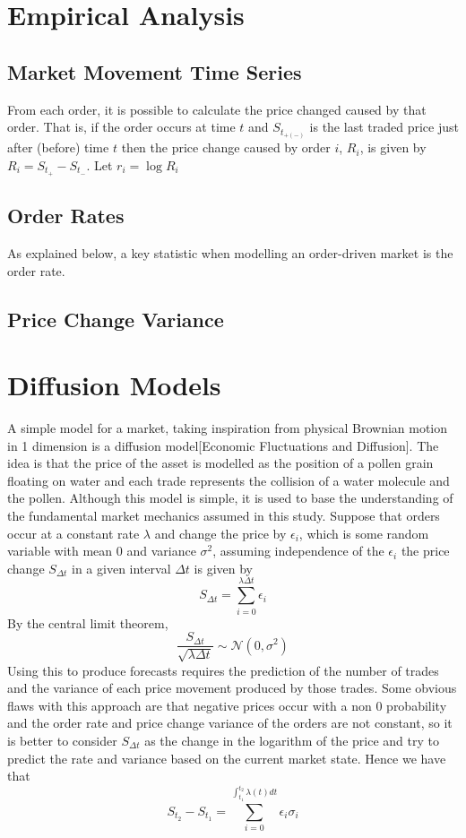 \documentclass[a4paper,10pt]{article}
\begin{document}
\section{Empirical Analysis}
\subsection{Market Movement Time Series}
From each order, it is possible to calculate the price changed caused by that order. That is, if the order occurs at time $t$ and $S_{t_{+(-)}}$ is the last traded price just after (before) time $t$ then the price change caused by order $i$, $R_i$, is given by $R_i = S_{t_{+}} - S_{t_{-}}$. Let $r_i = \log R_i$
\subsection{Order Rates}
As explained below, a key statistic when modelling an order-driven market is the order rate.
\subsection{Price Change Variance}
\section{Diffusion Models}
A simple model for a market, taking inspiration from physical Brownian motion in 1 dimension is a diffusion model[Economic Fluctuations and Diffusion]. The idea is that the price of the asset is modelled as the position of a pollen grain floating on water and each trade represents the collision of a water molecule and the pollen. Although this model is simple, it is used to base the understanding of the fundamental market mechanics assumed in this study. Suppose that orders occur at a constant rate $\lambda$ and change the price by $\epsilon_i$, which is some random variable with mean 0 and variance $\sigma^2$, assuming independence of the $\epsilon_i$ the price change $S_{\Delta t}$ in a given interval $\Delta t$ is given by
\begin{equation}
S_{\Delta t} = \sum_{i = 0}^{\lambda \Delta t}\epsilon_i
\end{equation}
By the central limit theorem, 
\begin{equation}
\frac{S_{\Delta t}}{\sqrt{\lambda \Delta t}} \sim \mathcal{N}(0, \sigma^{2})
\end{equation}
Using this to produce forecasts requires the prediction of the number of trades and the variance of each price movement produced by those trades. Some obvious flaws with this approach are that negative prices occur with a non 0 probability and the order rate and price change variance of the orders are not constant, so it is better to consider $S_{\Delta t}$ as the change in the logarithm of the price and try to predict the rate and variance based on the current market state. Hence we have that
\begin{equation}
S_{t_2} - S_{t_1} = \sum_{i = 0}^{\int_{t_1}^{t_2}\lambda(t)dt}\epsilon_i\sigma_i
\end{equation}
\end{document}
